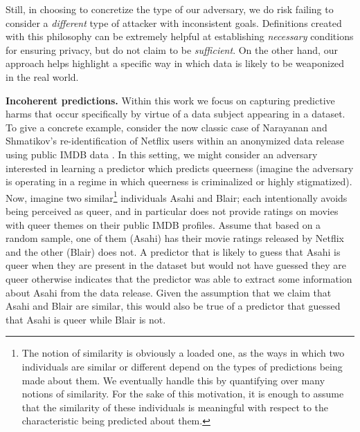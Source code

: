 Still, in choosing to concretize the type of our adversary, we do risk failing to consider a \textit{different} type of attacker with inconsistent goals. Definitions created with this philosophy can be extremely helpful at establishing \emph{necessary} conditions for ensuring privacy, but do not claim to be \textit{sufficient}. On the other hand, our approach helps highlight a specific way in which data is likely to be weaponized in the real world. 

\newcommand{\examplenameone}{Asahi\xspace} %
\newcommand{\examplenametwo}{Blair\xspace} %
    
\medskip\noindent
\textbf{Incoherent predictions.} 
Within this work we focus on capturing predictive harms that occur specifically by virtue of a data subject appearing in a dataset. To give a concrete example, consider the now classic case of Narayanan and Shmatikov's re-identification of Netflix users within an anonymized data release using public IMDB data \cite{SP:NarShm08}.  In this setting, we might consider an adversary interested in learning a predictor which predicts queerness (\eg imagine the adversary is operating in a regime in which queerness is criminalized or highly stigmatized). Now, imagine two similar\footnote{The notion of similarity is obviously a loaded one, as the ways in which two individuals are similar or different depend on the types of predictions being made about them. We eventually handle this by quantifying over many notions of similarity. For the sake of this motivation, it is enough to assume that the similarity of these individuals is meaningful with respect to the characteristic being predicted about them.} individuals \examplenameone and \examplenametwo; each intentionally avoids being perceived as queer, and in particular does not provide ratings on movies with queer themes on their public IMDB profiles. Assume that based on a random sample, one of them (\eg \examplenameone) has their movie ratings released by Netflix and the other (\eg \examplenametwo) does not. A predictor that is likely to guess that \examplenameone is queer when they are present in the dataset but would not have guessed they are queer otherwise indicates that the predictor was able to extract some information about \examplenameone from the data release.  Given the assumption that we claim that \examplenameone and \examplenametwo are similar, this would also be true of a predictor that guessed that \examplenameone is queer while \examplenametwo is not. 


